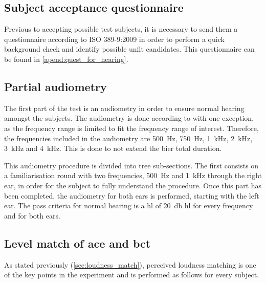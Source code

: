 \subsection{Subject acceptance questionnaire}
Previous to accepting possible test subjects, it is necessary to send them a questionnaire according to ISO 389-9:2009 \citep{iso_389-9} in order to perform a quick background check and identify possible unfit candidates. This questionnaire can be found in \autoref{apend:quest_for_hearing}.
  
\subsection{Partial audiometry}
The first part of the test is an audiometry in order to ensure normal hearing amongst the subjects. The audiometry is done according to \citep{iso_8253-2} with one exception, as the frequency range is limited to fit the frequency range of interest. Therefore, the frequencies included in the audiometry are \SI{500}{\hertz}, \SI{750}{\hertz}, \SI{1}{\kilo\hertz}, \SI{2}{\kilo\hertz}, \SI{3}{\kilo\hertz} and \SI{4}{\kilo\hertz}. This is done to not extend the \gls{bier} total duration.

This audiometry procedure is divided into tree sub-sections. The first consists on a familiarisation round with two frequencies, \SI{500}{\hertz} and \SI{1}{\kilo\hertz} through the right ear, in order for the subject to fully understand the procedure. Once this part has been completed, the audiometry for both ears is performed, starting with the left ear. The pass criteria for normal hearing is a \gls{hl} of \SI{20}{\decibel} \gls{hl} for every frequency and for both ears.
   
\subsection{Level match of \gls{ace} and \gls{bct}}\label{ssec:match}
As stated previously (\autoref{sec:loudness_match}), perceived loudness matching is one of the key points in the experiment and is performed as follows for every subject. 

